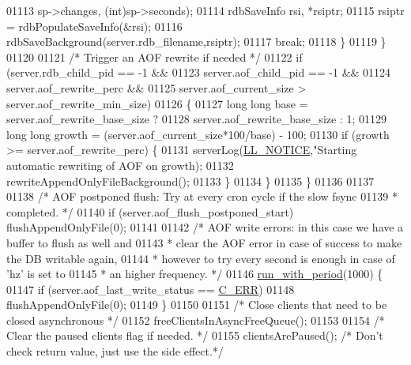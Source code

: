 \begin{DoxyCode}
{{{{{{{{{{{01113                     sp->changes, (\textcolor{keywordtype}{int})sp->seconds);
01114                 rdbSaveInfo rsi, *rsiptr;
01115                 rsiptr = rdbPopulateSaveInfo(&rsi);
01116                 rdbSaveBackground(server.rdb\_filename,rsiptr);
01117                 \textcolor{keywordflow}{break};
01118             \}
01119          \}
01120 
01121          \textcolor{comment}{/* Trigger an AOF rewrite if needed */}
01122          \textcolor{keywordflow}{if} (server.rdb\_child\_pid == -1 &&
01123              server.aof\_child\_pid == -1 &&
01124              server.aof\_rewrite\_perc &&
01125              server.aof\_current\_size > server.aof\_rewrite\_min\_size)
01126          \{
01127             \textcolor{keywordtype}{long} \textcolor{keywordtype}{long} base = server.aof\_rewrite\_base\_size ?
01128                             server.aof\_rewrite\_base\_size : 1;
01129             \textcolor{keywordtype}{long} \textcolor{keywordtype}{long} growth = (server.aof\_current\_size*100/base) - 100;
01130             \textcolor{keywordflow}{if} (growth >= server.aof\_rewrite\_perc) \{
01131                 serverLog(\hyperlink{server_8h_a8c54c191e436c7dd3012167212692401}{LL\_NOTICE},\textcolor{stringliteral}{"Starting automatic rewriting of AOF on %
      growth);
01132                 rewriteAppendOnlyFileBackground();
01133             \}
01134          \}
01135     \}
01136 
01137 
01138     \textcolor{comment}{/* AOF postponed flush: Try at every cron cycle if the slow fsync}
01139 \textcolor{comment}{     * completed. */}
01140     \textcolor{keywordflow}{if} (server.aof\_flush\_postponed\_start) flushAppendOnlyFile(0);
01141 
01142     \textcolor{comment}{/* AOF write errors: in this case we have a buffer to flush as well and}
01143 \textcolor{comment}{     * clear the AOF error in case of success to make the DB writable again,}
01144 \textcolor{comment}{     * however to try every second is enough in case of 'hz' is set to}
01145 \textcolor{comment}{     * an higher frequency. */}
01146     \hyperlink{server_8h_aeb204872adbaabc0bd56c64f562b7928}{run\_with\_period}(1000) \{
01147         \textcolor{keywordflow}{if} (server.aof\_last\_write\_status == \hyperlink{server_8h_af98ac28d5f4d23d7ed5985188e6fb7d1}{C\_ERR})
01148             flushAppendOnlyFile(0);
01149     \}
01150 
01151     \textcolor{comment}{/* Close clients that need to be closed asynchronous */}
01152     freeClientsInAsyncFreeQueue();
01153 
01154     \textcolor{comment}{/* Clear the paused clients flag if needed. */}
01155     clientsArePaused(); \textcolor{comment}{/* Don't check return value, just use the side effect.*/}
}}}}}}}}}}}}
\end{DoxyCode}
